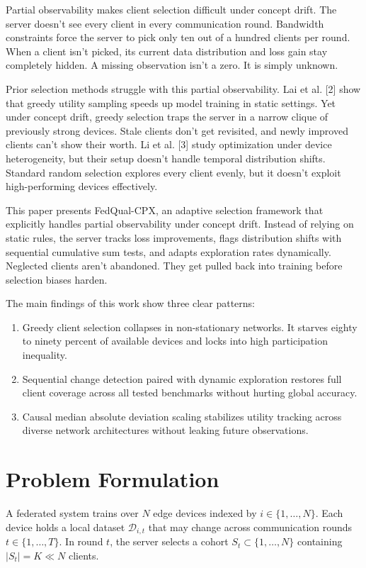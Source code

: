 \documentclass[conference]{IEEEtran}
\begin{document}
Partial observability makes client selection difficult under concept drift. The server doesn't see every client in every communication round. Bandwidth constraints force the server to pick only ten out of a hundred clients per round. When a client isn't picked, its current data distribution and loss gain stay completely hidden. A missing observation isn't a zero. It is simply unknown.

Prior selection methods struggle with this partial observability. Lai et al. [2] show that greedy utility sampling speeds up model training in static settings. Yet under concept drift, greedy selection traps the server in a narrow clique of previously strong devices. Stale clients don't get revisited, and newly improved clients can't show their worth. Li et al. [3] study optimization under device heterogeneity, but their setup doesn't handle temporal distribution shifts. Standard random selection explores every client evenly, but it doesn't exploit high-performing devices effectively.

This paper presents FedQual-CPX, an adaptive selection framework that explicitly handles partial observability under concept drift. Instead of relying on static rules, the server tracks loss improvements, flags distribution shifts with sequential cumulative sum tests, and adapts exploration rates dynamically. Neglected clients aren't abandoned. They get pulled back into training before selection biases harden.

The main findings of this work show three clear patterns:
\begin{enumerate}
    \item Greedy client selection collapses in non-stationary networks. It starves eighty to ninety percent of available devices and locks into high participation inequality.
    \item Sequential change detection paired with dynamic exploration restores full client coverage across all tested benchmarks without hurting global accuracy.
    \item Causal median absolute deviation scaling stabilizes utility tracking across diverse network architectures without leaking future observations.
\end{enumerate}

\section{Problem Formulation}
A federated system trains over $N$ edge devices indexed by $i \in \{1, \dots, N\}$. Each device holds a local dataset $\mathcal{D}_{i,t}$ that may change across communication rounds $t \in \{1, \dots, T\}$. In round $t$, the server selects a cohort $S_t \subset \{1, \dots, N\}$ containing $|S_t| = K \ll N$ clients.
\end{document}
